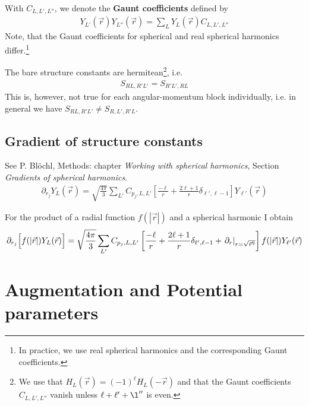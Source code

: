 \documentclass[11pt,a4paper]{report}
\begin{document}
With $C_{L,L',L''}$, we denote the \textbf{Gaunt
  coefficients} defined by
\begin{eqnarray}
Y_{L'}(\vec{r})Y_{L''}(\vec{r})=\sum_L Y_{L}(\vec{r})C_{L,L',L''}
\end{eqnarray}
Note, that the Gaunt coefficients for spherical and real spherical
harmonics differ.\footnote{In practice, we use real spherical
  harmonics and the corresponding Gaunt coefficients.}

The bare structure constants are hermitean\footnote{We use that
  $H_L(\vec{r})=(-1)^\ell H_L(-\vec{r})$ and that the Gaunt
  coefficients $C_{L,L',L''}$ vanish unless $\ell+\ell'+\l''$ is
  even.}, i.e.
\begin{eqnarray}
S_{RL,R'L'}=S_{R'L',RL}
\end{eqnarray}
This is, however, not true for each angular-momentum block individually,
i.e. in general we have $S_{RL,R'L'}\neq S_{R,L',R'L}$.



\subsection{Gradient of structure constants}

See P. Bl\"ochl, Methods: chapter \textit{Working with spherical harmonics},
Section \textit{Gradients of spherical harmonics}.
\begin{eqnarray}
\partial_{r_j} Y_L(\vec{r})=\sqrt{\frac{4\pi}{3}}\sum_{L'}
C_{p_j,L,L'}\left[\frac{-\ell}{r}+\frac{2\ell+1}{r}\delta_{\ell',\ell-1}
\right]Y_{\ell'}(\vec{r})
\end{eqnarray}


For the product of a radial function $f(|\vec{r}|)$ and a spherical 
harmonic I obtain
\begin{eqnarray}
\partial_{r_j}\Bigl[f(|\vec{r}|) Y_L(\vec{r})\Bigr]
=\sqrt{\frac{4\pi}{3}}\sum_{L'}
C_{p_j,L,L'}
\left[
\frac{-\ell}{r}+\frac{2\ell+1}{r}\delta_{\ell',\ell-1}
+\left.\partial_r\right|_{r=\sqrt{\vec{r}^2}} 
\right]
f(|\vec{r}|)Y_{\ell'}(\vec{r})
\end{eqnarray}




\section{Augmentation and Potential parameters}
\end{document}
